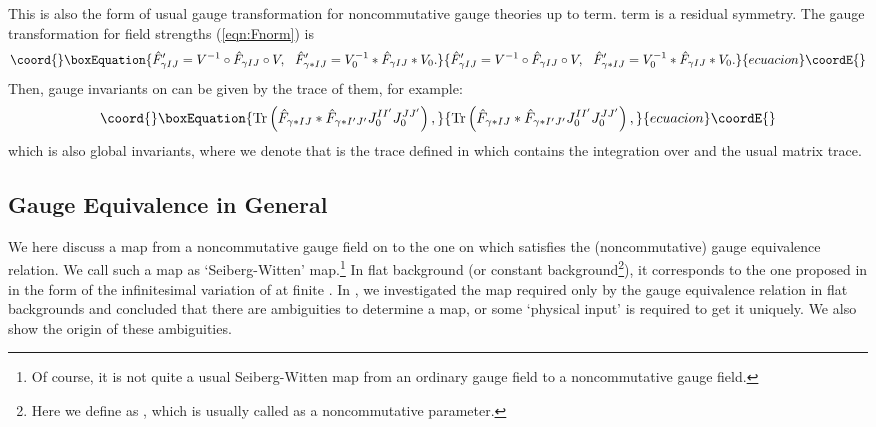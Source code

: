\documentclass[10pt,a4paper]{article}
\def\h{\hbar}
\begin{document}
This is also the form of usual gauge transformation for noncommutative gauge theories up to \coordHE{} term. \coordHE{} term is a residual symmetry.
The gauge transformation for field strengths (\ref{eqn:Fnorm}) is
\begin{equation}\coord{}\boxEquation{
{\hat F}'_{\gamma IJ}=V^{-1}\circ {\hat F}_{\gamma IJ}\circ V,
\ \ {\hat F}'_{\gamma*IJ}=V_0^{-1}*{\hat F}_{\gamma IJ}*V_0.
}{
{\hat F}'_{\gamma IJ}=V^{-1}\circ {\hat F}_{\gamma IJ}\circ V,
\ \ {\hat F}'_{\gamma*IJ}=V_0^{-1}*{\hat F}_{\gamma IJ}*V_0.
}{ecuacion}\coordE{}\end{equation}
Then, gauge invariants on \myHighlight{$(C^\infty(M)[[\h]]\otimes {\cal A}.*)$}\coordHE{} can be given by the trace of them, for example:
\begin{equation}\coord{}\boxEquation{
{\rm Tr}\left({\hat F}_{\gamma*IJ}*{\hat F}_{\gamma*I'J'}J_0^{II'}J_0^{JJ'}\right),
}{
{\rm Tr}\left({\hat F}_{\gamma*IJ}*{\hat F}_{\gamma*I'J'}J_0^{II'}J_0^{JJ'}\right),
}{ecuacion}\coordE{}\end{equation}
which is also global \coordHE{} invariants, where we denote that \coordHE{} is the trace defined in \cite{Fed}\cite{Fedbk} which contains the integration over \coordHE{} and the usual \coordHE{} matrix trace. 



\subsection{Gauge Equivalence in General
\label{sec:gegc}}

We here discuss a map from a noncommutative gauge field on \myHighlight{$(C^\infty(M)[[\h]]\otimes {\cal A},*)$}\coordHE{} to the one on \myHighlight{$(C^\infty(M)[[\h]]\otimes {\cal A},*')$}\coordHE{}
which satisfies the (noncommutative) gauge equivalence relation. We call such a map as `Seiberg-Witten' map.\footnote{
	Of course, it is not quite a usual Seiberg-Witten map from an ordinary gauge field to a noncommutative gauge field.
}
In flat background (or constant \myHighlight{$\vartheta^{\mu\nu}$}\coordHE{} background\footnote{
        Here we define \myHighlight{$\vartheta^{\mu\nu}$}\coordHE{} as  \coordHE{}, which is usually called as a noncommutative parameter.
}), it corresponds to the one proposed in \cite{SW} in the form of the infinitesimal variation of  \myHighlight{$\vartheta^{\mu\nu}$}\coordHE{} at finite \myHighlight{$\vartheta^{\mu\nu}$}\coordHE{}.
In \cite{AK}, we investigated the map required only by the gauge equivalence relation in flat backgrounds and concluded that there are ambiguities to determine a map, or some `physical input' is required to get it uniquely.
We also show the origin of these ambiguities.\\
\end{document}
